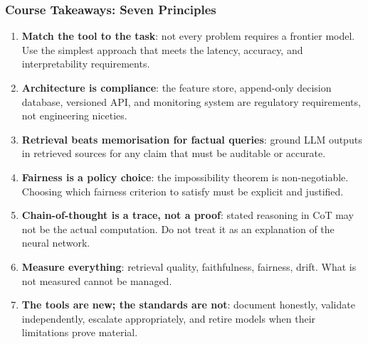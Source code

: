\documentclass[9pt,t]{beamer}
\begin{document}
\begin{frame}
\frametitle{Course Takeaways: Seven Principles}

\begin{enumerate}
  \item \textbf{Match the tool to the task}: not every problem requires a frontier model. Use the simplest approach that meets the latency, accuracy, and interpretability requirements.

  \item \textbf{Architecture is compliance}: the feature store, append-only decision database, versioned API, and monitoring system are regulatory requirements, not engineering niceties.

  \item \textbf{Retrieval beats memorisation for factual queries}: ground LLM outputs in retrieved sources for any claim that must be auditable or accurate.

  \item \textbf{Fairness is a policy choice}: the impossibility theorem is non-negotiable. Choosing which fairness criterion to satisfy must be explicit and justified.

  \item \textbf{Chain-of-thought is a trace, not a proof}: stated reasoning in CoT may not be the actual computation. Do not treat it as an explanation of the neural network.

  \item \textbf{Measure everything}: retrieval quality, faithfulness, fairness, drift. What is not measured cannot be managed.

  \item \textbf{The tools are new; the standards are not}: document honestly, validate independently, escalate appropriately, and retire models when their limitations prove material.
\end{enumerate}
\end{frame}

\end{document}
